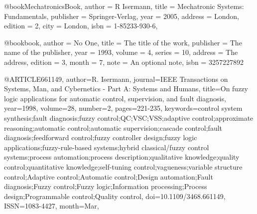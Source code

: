 @book{MechatronicsBook,
  author = {R Isermann},
  title = {Mechatronic Systems: Fundamentals},
  publisher = {Springer-Verlag},
  year = {2005},
  address   = {London}, 
  edition   = {2},
  city      = {London}, 
  isbn      = {1-85233-930-6},
}

@book{book,
  author    = {No One}, 
  title     = {The title of the work},
  publisher = {The name of the publisher},
  year      = 1993,
  volume    = 4,
  series    = 10,
  address   = {The address},
  edition   = 3,
  month     = 7,
  note      = {An optional note},
  isbn      = {3257227892}
}

@ARTICLE{661149, 
author={R. Isermann}, 
journal={IEEE Transactions on Systems, Man, and Cybernetics - Part A: Systems and Humans}, 
title={On fuzzy logic applications for automatic control, supervision, and fault diagnosis}, 
year={1998}, 
volume={28}, 
number={2}, 
pages={221-235}, 
keywords={control system synthesis;fault diagnosis;fuzzy control;QC;VSC;VSS;adaptive control;approximate reasoning;automatic control;automatic supervision;cascade control;fault diagnosis;feedforward control;fuzzy controller design;fuzzy logic applications;fuzzy-rule-based systems;hybrid classical/fuzzy control systems;process automation;process description;qualitative knowledge;quality control;quantitative knowledge;self-tuning control;vagueness;variable structure control;Adaptive control;Automatic control;Design automation;Fault diagnosis;Fuzzy control;Fuzzy logic;Information processing;Process design;Programmable control;Quality control}, 
doi={10.1109/3468.661149}, 
ISSN={1083-4427}, 
month={Mar},}